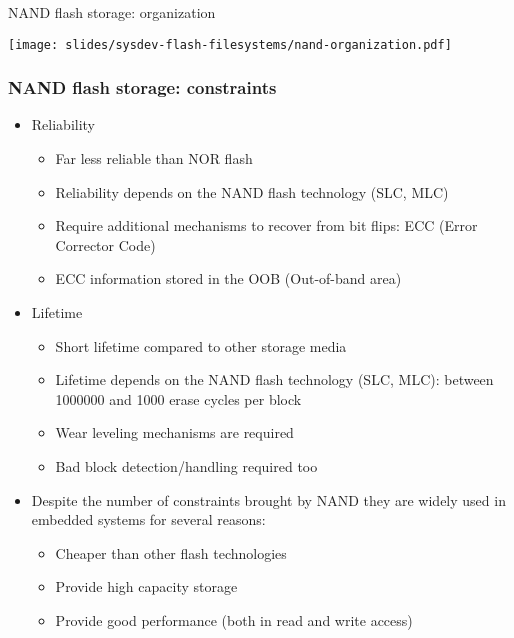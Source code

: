 \begin{frame}{NAND flash storage: organization}
  \begin{center}
    \texttt{[image: slides/sysdev-flash-filesystems/nand-organization.pdf]}
  \end{center}
\end{frame}

\begin{frame}
  \frametitle{NAND flash storage: constraints}
  \begin{itemize}
  \item Reliability
    \begin{itemize}
    \item Far less reliable than NOR flash
    \item Reliability depends on the NAND flash technology (SLC, MLC)
    \item Require additional mechanisms to recover from bit flips: ECC
      (Error Corrector Code)
    \item ECC information stored in the OOB (Out-of-band area)
    \end{itemize}
  \item Lifetime
    \begin{itemize}
    \item Short lifetime compared to other storage media
    \item Lifetime depends on the NAND flash technology (SLC, MLC):
      between 1000000 and 1000 erase cycles per block
    \item Wear leveling mechanisms are required
    \item Bad block detection/handling required too
    \end{itemize}
  \item Despite the number of constraints brought by NAND they are
    widely used in embedded systems for several reasons:
    \begin{itemize}
    \item Cheaper than other flash technologies
    \item Provide high capacity storage
    \item Provide good performance (both in read and write access)
    \end{itemize}
  \end{itemize}
\end{frame}

